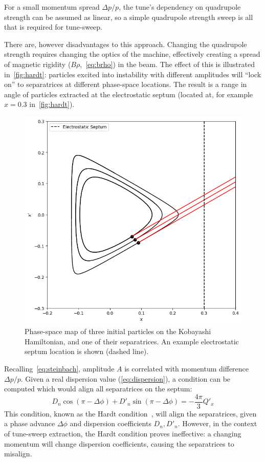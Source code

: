 \documentclass[11pt]{report}
\begin{document}
For a small momentum spread $\Delta p/p$, the tune's dependency on quadrupole strength can be assumed as linear, so a simple quadrupole strength sweep is all that is required for tune-sweep.

There are, however disadvantages to this approach. Changing the quadrupole strength requires changing the optics of the machine, effectively creating a spread of magnetic rigidity ($B\rho$,~\autoref{eq:brho}) in the beam. The effect of this is illustrated in~\autoref{fig:hardt}: particles excited into instability with different amplitudes will ``lock on'' to separatrices at different phase-space locations. The result is a range in angle of particles extracted at the electrostatic septum (located at, for example $x=0.3$ in~\autoref{fig:hardt}).

\begin{figure}
  \centering
  \includegraphics[width=0.6\linewidth]{hardt.png}
  \caption{Phase-space map of three initial particles on the Kobayashi Hamiltonian, and one of their separatrices. An example electrostatic septum location is shown (dashed line).}\label{fig:hardt}
\end{figure}

Recalling~\autoref{eq:steinbach}, amplitude $A$ is correlated with momentum difference $\Delta p/p$. Given a real dispersion value (\autoref{eq:dispersion}), a condition can be computed which would align all separatrices on the septum:
\begin{equation}
  D_n\cos(\pi-\Delta\phi)+D'_n\sin(\pi-\Delta\phi)=-\frac{4\pi}3Q'_x
\end{equation}
This condition, known as the Hardt condition~\cite{hardt}, will align the separatrices, given a phase advance $\Delta\phi$ and dispersion coefficients $D_n, D'_n$. However, in the context of tune-sweep extraction, the Hardt condition proves ineffective: a changing momentum will change dispersion coefficients, causing the separatrices to misalign.
\end{document}
